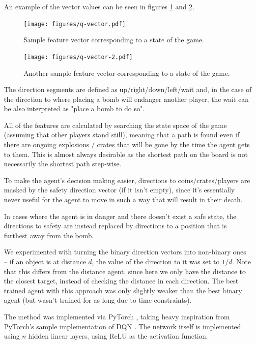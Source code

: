 \documentclass{article}
\begin{document}
An example of the vector values can be seen in figures \ref{fig:q-vector} and \ref{fig:q-vector-2}.

\begin{figure}[t]
    \centering
    \texttt{[image: figures/q-vector.pdf]}
    \caption{Sample feature vector corresponding to a state of the game.}
    \label{fig:q-vector}
\end{figure}

\begin{figure}[b]
    \centering
    \texttt{[image: figures/q-vector-2.pdf]}
    \caption{Another sample feature vector corresponding to a state of the game.}
    \label{fig:q-vector-2}
\end{figure}

The direction segments are defined as up/right/down/left/wait and, in the case of the direction to where placing a bomb will endanger another player, the wait can be also interpreted as "place a bomb to do so".

All of the features are calculated by searching the state space of the game (assuming that other players stand still), meaning that a path is found even if there are ongoing explosions / crates that will be gone by the time the agent gets to them.
This is almost always desirable as the shortest path on the board is not necessarily the shortest path step-wise.

To make the agent's decision making easier, directions to coins/crates/players are masked by the safety direction vector (if it isn't empty), since it's essentially never useful for the agent to move in such a way that will result in their death.

In cases where the agent is in danger and there doesn't exist a safe state, the directions to safety are instead replaced by directions to a position that is furthest away from the bomb.

We experimented with turning the binary direction vectors into non-binary ones -- if an object is at distance $d$, the value of the direction to it was set to $1/d$.
Note that this differs from the distance agent, since here we only have the distance to the closest target, instead of checking the distance in each direction.
The best trained agent with this approach was only slightly weaker than the best binary agent (but wasn't trained for as long due to time constraints).

The method was implemented via PyTorch \cite{pytorch}, taking heavy inspiration from PyTorch's sample implementation of DQN \cite{pydqn}.
The network itself is implemented using $n$ hidden linear layers, using ReLU as the activation function.
\end{document}
